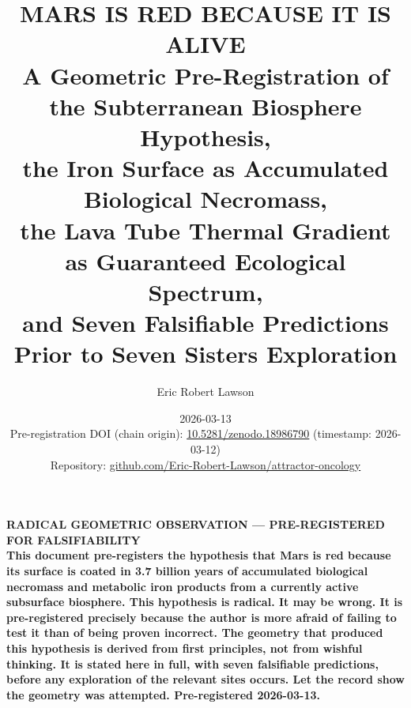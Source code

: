 \documentclass[11pt, a4paper]{article}
\begin{document}
\title{
  \large\bfseries\color{headerblue}
  MARS IS RED BECAUSE IT IS ALIVE\\[0.4em]
  \normalsize\color{headerblue}
  A Geometric Pre-Registration of the
  Subterranean Biosphere Hypothesis,\\
  the Iron Surface as Accumulated Biological
  Necromass,\\
  the Lava Tube Thermal Gradient as Guaranteed
  Ecological Spectrum,\\
  and Seven Falsifiable Predictions Prior to
  Seven Sisters Exploration
}

\author[1]{Eric Robert Lawson}

\date{2026-03-13\\[0.3em]
  \footnotesize
  Pre-registration DOI (chain origin):
  \href{https://doi.org/10.5281/zenodo.18986790}
  {10.5281/zenodo.18986790}
  (timestamp: 2026-03-12)\\
  Repository:
  \href{https://github.com/Eric-Robert-Lawson/attractor-oncology}
  {github.com/Eric-Robert-Lawson/attractor-oncology}
}

\maketitle
\thispagestyle{empty}

\begin{mdframed}[
  backgroundcolor=clownbox,
  linecolor=clownbox,
  linewidth=0pt,
  innertopmargin=0.7em,
  innerbottommargin=0.7em,
  innerleftmargin=1em,
  innerrightmargin=1em
]
\begin{center}
\small\bfseries\color{white}
RADICAL GEOMETRIC OBSERVATION ---
PRE-REGISTERED FOR FALSIFIABILITY\\[0.3em]
\normalfont\small\color{white}
This document pre-registers the hypothesis that
Mars is red because its surface is coated in
3.7 billion years of accumulated biological
necromass and metabolic iron products from a
currently active subsurface biosphere.
This hypothesis is radical. It may be wrong.
It is pre-registered precisely because the
author is more afraid of failing to test it
than of being proven incorrect.
The geometry that produced this hypothesis
is derived from first principles, not from
wishful thinking. It is stated here in full,
with seven falsifiable predictions, before any
exploration of the relevant sites occurs.
Let the record show the geometry was attempted.
Pre-registered 2026-03-13.
\end{center}
\end{mdframed}
\end{document}
